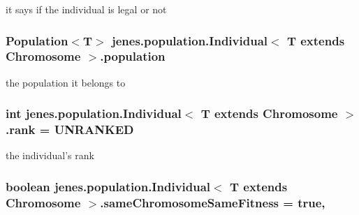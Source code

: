it says if the individual is legal or not \hypertarget{classjenes_1_1population_1_1_individual_3_01_t_01extends_01_chromosome_01_4_a6a4149139b12672baab0d9d65cdeffb2}{
\subsubsection[{population}]{\setlength{\rightskip}{0pt plus 5cm}Population$<$T$>$ jenes.\-population.\-Individual$<$ T extends Chromosome $>$.population\hspace{0.3cm}{\ttfamily [private]}}}\label{classjenes_1_1population_1_1_individual_3_01_t_01extends_01_chromosome_01_4_a6a4149139b12672baab0d9d65cdeffb2}
the population it belongs to \hypertarget{classjenes_1_1population_1_1_individual_3_01_t_01extends_01_chromosome_01_4_a393116ea0dc6238686c67292f5f8a9ca}{
\subsubsection[{rank}]{\setlength{\rightskip}{0pt plus 5cm}int jenes.\-population.\-Individual$<$ T extends Chromosome $>$.rank = {\bf U\-N\-R\-A\-N\-K\-E\-D}\hspace{0.3cm}{\ttfamily [private]}}}\label{classjenes_1_1population_1_1_individual_3_01_t_01extends_01_chromosome_01_4_a393116ea0dc6238686c67292f5f8a9ca}
the individual's rank \hypertarget{classjenes_1_1population_1_1_individual_3_01_t_01extends_01_chromosome_01_4_a76c4bb153b0ed0eb30b9cf1faa376c20}{
\subsubsection[{same\-Chromosome\-Same\-Fitness}]{\setlength{\rightskip}{0pt plus 5cm}boolean jenes.\-population.\-Individual$<$ T extends Chromosome $>$.same\-Chromosome\-Same\-Fitness = true\hspace{0.3cm}{\ttfamily [static]}, {\ttfamily [private]}}}\label{classjenes_1_1population_1_1_individual_3_01_t_01extends_01_chromosome_01_4_a76c4bb153b0ed0eb30b9cf1faa376c20}
